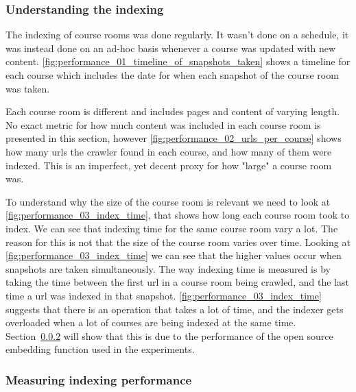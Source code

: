 


\subsubsection{Understanding the indexing}
\label{sec:understanding_indexing}


The indexing of course rooms was done regularly. It wasn’t done on a schedule, it was instead done on an ad-hoc basis whenever a course was updated with new content. \autoref{fig:performance_01_timeline_of_snapshots_taken} shows a timeline for each course which includes the date for when each snapshot of the course room was taken.





Each course room is different and includes pages and content of varying length. No exact metric for how much content was included in each course room is presented in this section, however \autoref{fig:performance_02_urls_per_course} shows how many urls the crawler found in each course, and how many of them were indexed. This is an imperfect, yet decent proxy for how "large" a course room was.





To understand why the size of the course room is relevant we need to look at \autoref{fig:performance_03_index_time}, that shows how long each course room took to index. We can see that indexing time for the same course room vary a lot. The reason for this is not that the size of the course room varies over time. Looking at \autoref{fig:performance_03_index_time} we can see that the higher values occur when snapshots are taken simultaneously. The way indexing time is measured is by taking the time between the first url in a course room being crawled, and the last time a url was indexed in that snapshot. \autoref{fig:performance_03_index_time} suggests that there is an operation that takes a lot of time, and the indexer gets overloaded when a lot of courses are being indexed at the same time. Section~\ref{sec:measuring_indexing_performance} will show that this is due to the performance of the open source embedding function used in the experiments.





\subsubsection{Measuring indexing performance}
\label{sec:measuring_indexing_performance}


